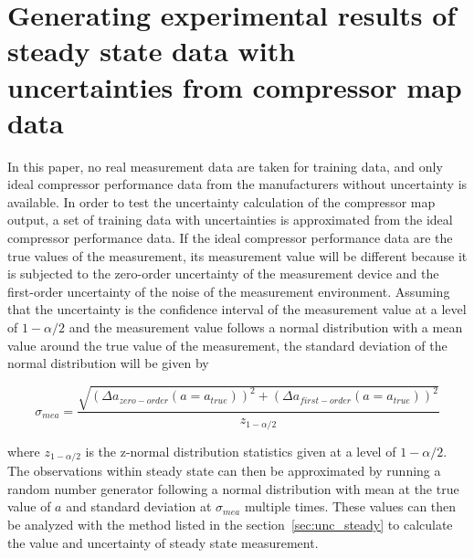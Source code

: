 \section{Generating experimental results of steady state data with uncertainties from compressor map data}
\label{sec:approx_uncertainty}
In this paper, no real measurement data are taken for training data, and only ideal compressor performance data from the manufacturers without uncertainty is available. In order to test the uncertainty calculation of the compressor map output, a set of training data with uncertainties is approximated from the ideal compressor performance data. If the ideal compressor performance data are the true values of the measurement, its measurement value will be different because it is subjected to the zero-order uncertainty of the measurement device and the first-order uncertainty of the noise of the measurement environment.  Assuming that the uncertainty is the confidence interval of the measurement value at a level of $1-\alpha/2$ and the measurement value follows a normal distribution with a mean value around the true value of the measurement, the standard deviation of the normal distribution will be given by

\begin{equation}
{\sigma _{mea}} = \frac{{\sqrt {{{(\Delta {a_{zero - order}}(a = {a_{true}}))}^2} + {{(\Delta {a_{first - order}}(a = {a_{true}}))}^2}} }}{{{z_{1 - \alpha /2}}}}
\label{eq:std_norm}
\end{equation}

where $z_{1-\alpha/2}$ is the z-normal distribution statistics given at a level of ${1-\alpha/2}$. The observations within steady state can then be approximated by running a random number generator following a normal distribution with mean at the true value of $a$ and standard deviation at $\sigma_{mea}$ multiple times. These values can then be analyzed with the method listed in the section~\ref{sec:unc_steady} to calculate the value and uncertainty of steady state measurement.